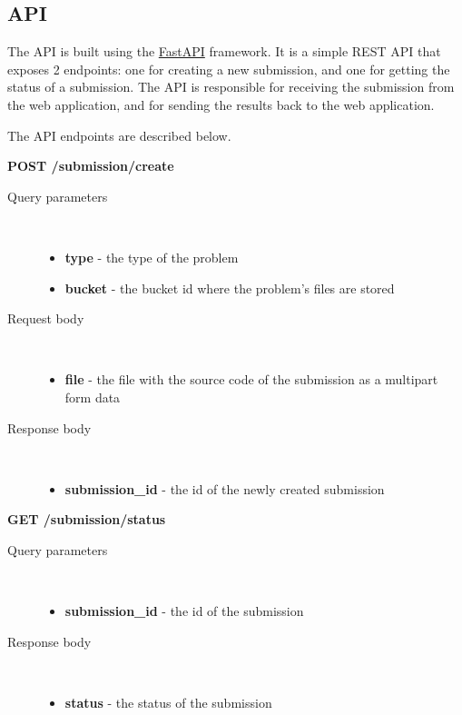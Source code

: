 \documentclass[12pt,a4paper]{report}
\begin{document}
\subsection{API}
The API is built using the \href{https://fastapi.tiangolo.com/}{FastAPI} framework. It is a simple REST API that exposes 2 endpoints: one for creating a new submission, and one for getting the status of a submission. The API is responsible for receiving the submission from the web application, and for sending the results back to the web application.

The API endpoints are described below.

\textbf{POST /submission/create}

\begin{description}
	\item[Query parameters]\
		\begin{itemize}
			\item \textbf{type} - the type of the problem
			\item \textbf{bucket} - the bucket id where the problem's files are stored
		\end{itemize}
	\item[Request body]\
		\begin{itemize}
			\item \textbf{file} - the file with the source code of the submission as a multipart form data
		\end{itemize}
	\item[Response body]\
		\begin{itemize}
			\item \textbf{submission\_id} - the id of the newly created submission
		\end{itemize}
\end{description}

\newpage
\textbf{GET /submission/status}
\begin{description}
	\item[Query parameters]\
		\begin{itemize}
			\item \textbf{submission\_id} - the id of the submission
		\end{itemize}
	\item[Response body]\
		\begin{itemize}
			\item \textbf{status} - the status of the submission
		\end{itemize}
\end{description}
\end{document}
